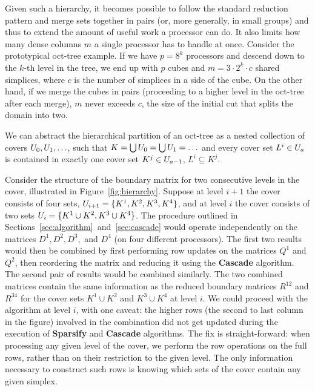Given such a hierarchy, it becomes possible to follow the standard reduction
pattern and merge sets together in pairs (or, more generally, in small groups) and
thus to extend the amount of useful work a processor can do. It also limits how
many dense columns $m$ a single processor has to handle at once.
%
Consider the prototypical oct-tree example.
If we have $p = 8^k$ processors and descend down to the $k$-th level in the
tree, we end up with $p$ cubes and $m = 3 \cdot 2^k \cdot c$ shared simplices,
where $c$ is the number of simplices in a side of the cube.
On the other hand, if we merge the cubes in pairs (proceeding to a higher level
in the oct-tree after each merge), $m$ never exceeds $c$, the size of the
initial cut that splits the domain into two.

We can abstract the hierarchical partition of an oct-tree as a nested collection of
covers $U_0, U_1, \ldots$, such that $K = \bigcup U_0 = \bigcup U_1 = \ldots$
and every cover set $L^i \in U_a$ is contained in exactly one cover set
$K^j \in U_{a-1}$, $L^i \subseteq K^j$.

Consider the structure of the boundary matrix for two consecutive levels in the
cover, illustrated in Figure~\ref{fig:hierarchy}. Suppose at level $i+1$ the
cover consists of four sets, $U_{i+1} = \{ K^1, K^2, K^3, K^4 \}$, and at level
$i$ the cover consists of two sets $U_i = \{ K^1 \cup K^2, K^3 \cup K^4 \}$.
%
The procedure outlined in
Sections~\ref{sec:algorithm}~and~\ref{sec:cascade} would operate independently
on the matrices $D^1, D^2, D^3,$ and $D^4$ (on four different processors). The first
two results would then be combined by first performing row updates on the matrices $Q^1$ and
$Q^2$, then reordering the matrix and reducing it using the {\bf Cascade}
algorithm.
The second pair of results would be combined similarly.
The two combined matrices contain the same information as the reduced boundary
matrices $R^{12}$ and $R^{34}$ for the cover sets $K^1 \cup K^2$
and $K^3 \cup K^4$ at level $i$. We could proceed with the algorithm at level
$i$, with one caveat: the higher rows (the second to last column in the figure)
involved in the combination did not get updated during the execution of {\bf
Sparsify} and {\bf Cascade} algorithms. The fix is straight-forward: when
processing any given level of the cover, we perform the row operations on the
full rows, rather than on their restriction to the given level.
The only information necessary to construct such rows is knowing which sets of
the cover contain any given simplex.

